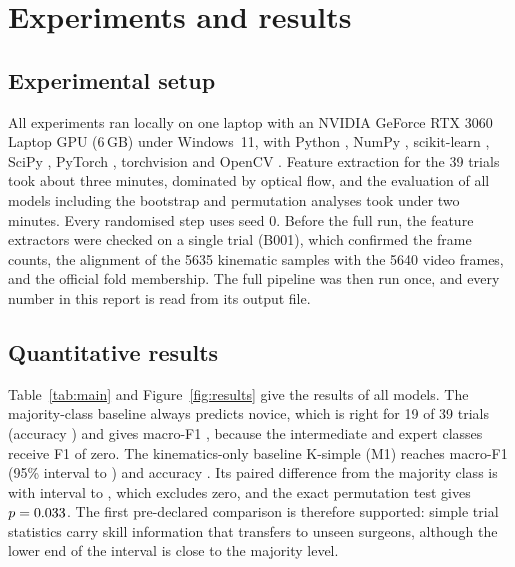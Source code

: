 \section{Experiments and results}

\subsection{Experimental setup}

All experiments ran locally on one laptop with an NVIDIA GeForce RTX 3060 Laptop GPU (6\,GB) under Windows~11, with Python \VerPython{}, NumPy \VerNumpy{}, scikit-learn \VerSklearn{}, SciPy \VerScipy{}, PyTorch \VerTorch{}, torchvision \VerTorchvision{} and OpenCV \VerOpencv{}. Feature extraction for the 39 trials took about three minutes, dominated by optical flow, and the evaluation of all models including the bootstrap and permutation analyses took under two minutes. Every randomised step uses seed 0. Before the full run, the feature extractors were checked on a single trial (B001), which confirmed the frame counts, the alignment of the 5635 kinematic samples with the 5640 video frames, and the official fold membership. The full pipeline was then run once, and every number in this report is read from its output file.

\subsection{Quantitative results}

Table~\ref{tab:main} and Figure~\ref{fig:results} give the results of all models. The majority-class baseline always predicts novice, which is right for 19 of 39 trials (accuracy \AccMZero{}) and gives macro-F1 \FMZero{}, because the intermediate and expert classes receive F1 of zero. The kinematics-only baseline K-simple (M1) reaches macro-F1 \FMOne{} (95\% interval \LoMOne{} to \HiMOne{}) and accuracy \AccMOne{}. Its paired difference from the majority class is \DOneZero{} with interval \DLoOneZero{} to \DHiOneZero{}, which excludes zero, and the exact permutation test gives $p = 0.033{}$. The first pre-declared comparison is therefore supported: simple trial statistics carry skill information that transfers to unseen surgeons, although the lower end of the interval is close to the majority level.

\begin{table}[htbp]
\centering
\small
\caption{Leave-one-user-out results on JIGSAWS Suturing (39 trials, 8 surgeons). Macro-F1, accuracy and per-class F1 are computed over the pooled out-of-fold predictions. The interval is the 2.5th to 97.5th percentile of 2000 user-level bootstrap resamples; $p$ is the exact user-level permutation $p$-value over all 420 label assignments. Bold rows are the kinematic baseline, the primary multimodal model and the focused improvement.}
\label{tab:main}

\end{table}

